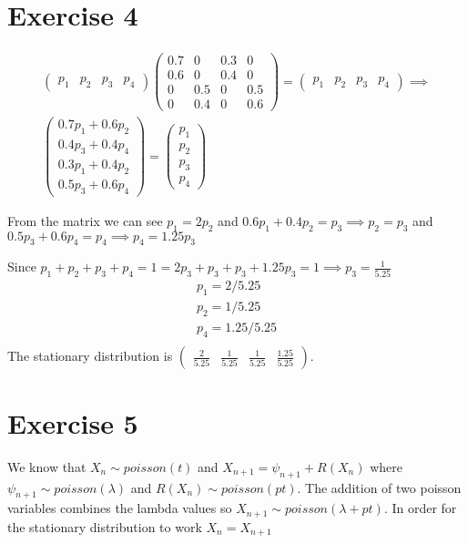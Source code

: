 \documentclass{article}\usepackage[]{graphicx}\usepackage[]{color}
\begin{document}
\section*{Exercise 4}
\begin{equation}
  \begin{split}
  \left(\begin{array}{cccc}
p_{1} & p_{2} & p_{3} & p_{4}\end{array}\right)\left(\begin{array}{cccc}
0.7 & 0 & 0.3 & 0\\
0.6 & 0 & 0.4 & 0\\
0 & 0.5 & 0 & 0.5\\
0 & 0.4 & 0 & 0.6
\end{array}\right)=\left(\begin{array}{cccc}
p_{1} & p_{2} & p_{3} & p_{4}\end{array}\right) \implies \\
\left(\begin{array}{c}
0.7p_{1}+0.6p_{2}\\
0.4p_{3}+0.4p_{4}\\
0.3p_{1}+0.4p_{2}\\
0.5p_{3}+0.6p_{4}
\end{array}\right)=\left(\begin{array}{c}
p_{1}\\
p_{2}\\
p_{3}\\
p_{4}
\end{array}\right)
  \end{split}
\end{equation}

From the matrix we can see $p_{1} = 2p_2$ and $0.6p_{1}+0.4p_2=p_3\implies p_2=p_3$ and $0.5p_3+0.6p_4=p_4 \implies p_4 =1.25p_3$

Since $p_1+p_2+p_3+p_4 =1 = 2p_3+p_3+p_3+1.25p_3 = 1 \implies p_3 = \frac{1}{5.25}$
\begin{equation}
\begin{split}
p_1 = 2/5.25 \\
p_2 = 1/5.25 \\ 
p_4 = 1.25/5.25 \\
\end{split}
\end{equation}
The stationary distribution is $\left(\begin{array}{cccc}
\frac{2}{5.25} & \frac{1}{5.25} & \frac{1}{5.25} & \frac{1.25}{5.25}\end{array}\right)$.
\section*{Exercise 5}
We know that $X_{n}\sim poisson(t)$ and $X_{n+1} = \psi_{n+1}+R(X_{n})$ where $\psi_{n+1} \sim poisson(\lambda)$ and $R(X_{n}) \sim poisson(pt)$. The addition of two poisson variables combines the lambda values so $X_{n+1} \sim poisson(\lambda + pt)$. In order for the stationary distribution to work $X_{n} = X_{n+1}$
\end{document}

